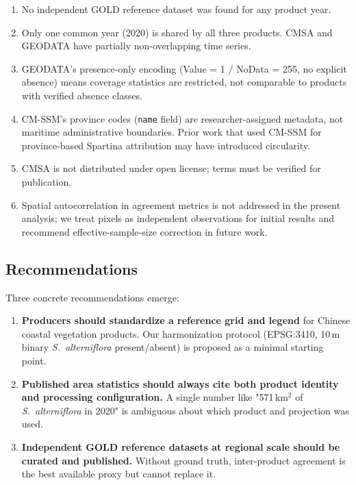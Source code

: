 \documentclass[11pt]{article}
\begin{document}
\begin{enumerate}[nosep]
\item No independent GOLD reference dataset was found for any product year.
\item Only one common year (2020) is shared by all three products. CMSA and
  GEODATA have partially non-overlapping time series.
\item GEODATA's presence-only encoding (Value = 1 / NoData = 255, no explicit
  absence) means coverage statistics are restricted, not comparable to products
  with verified absence classes.
\item CM-SSM's province codes (\texttt{name} field) are researcher-assigned
  metadata, not maritime administrative boundaries. Prior work that used CM-SSM
  for province-based Spartina attribution may have introduced circularity.
\item CMSA is not distributed under open license; terms must be verified for
  publication.
\item Spatial autocorrelation in agreement metrics is not addressed in the
  present analysis; we treat pixels as independent observations for initial
  results and recommend effective-sample-size correction in future work.
\end{enumerate}

\subsection{Recommendations}

Three concrete recommendations emerge:
\begin{enumerate}[nosep]
\item \textbf{Producers should standardize a reference grid and legend} for
  Chinese coastal vegetation products. Our harmonization protocol (EPSG:3410,
  10\,m binary \textit{S.~alterniflora} present/absent) is proposed as a
  minimal starting point.
\item \textbf{Published area statistics should always cite both product identity
  and processing configuration.} A single number like "571\,km$^2$ of
  \textit{S.~alterniflora} in 2020" is ambiguous about which product and
  projection was used.
\item \textbf{Independent GOLD reference datasets at regional scale should be
  curated and published.} Without ground truth, inter-product agreement is
  the best available proxy but cannot replace it.
\end{enumerate}
\end{document}
